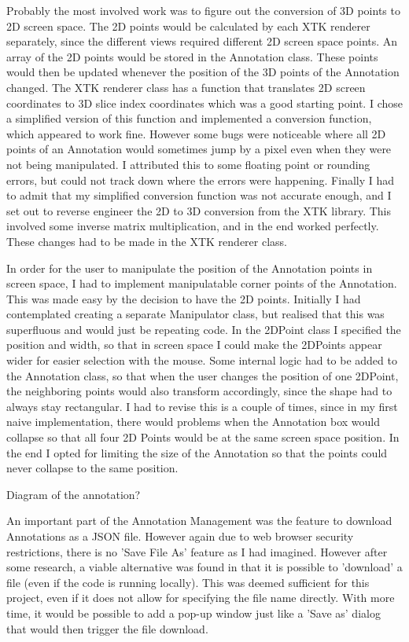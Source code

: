 \documentclass[a4paper,11pt,titlepage]{article}
\begin{document}
Probably the most involved work was to figure out the conversion of 3D points to 2D screen space. The 2D points would be calculated by each XTK renderer separately, since the different views required different 2D screen space points. An array of the 2D points would be stored in the Annotation class. These points would then be updated whenever the position of the 3D points of the Annotation changed. The XTK renderer class has a function that translates 2D screen coordinates to 3D slice index coordinates which was a good starting point. I chose a simplified version of this function and implemented a conversion function, which appeared to work fine. However some bugs were noticeable where all 2D points of an Annotation would sometimes jump by a pixel even when they were not being manipulated. I attributed this to some floating point or rounding errors, but could not track down where the errors were happening. Finally I had to admit that my simplified conversion function was not accurate enough, and I set out to reverse engineer the 2D to 3D conversion from the XTK library. This involved some inverse matrix multiplication, and in the end worked perfectly. These changes had to be made in the XTK renderer class.

In order for the user to manipulate the position of the Annotation points in screen space, I had to implement manipulatable corner points of the Annotation. This was made easy by the decision to have the 2D points. Initially I had contemplated creating a separate Manipulator class, but realised that this was superfluous and would just be repeating code. In the 2DPoint class I specified the position and width, so that in screen space I could make the 2DPoints appear wider for easier selection with the mouse. Some internal logic had to be added to the Annotation class, so that when the user changes the position of one 2DPoint, the neighboring points would also transform accordingly, since the shape had to always stay rectangular. I had to revise this is a couple of times, since in my first naive implementation, there would problems when the Annotation box would collapse so that all four 2D Points would be at the same screen space position. In the end I opted for limiting the size of the Annotation so that the points could never collapse to the same position.

Diagram of the annotation?


An important part of the Annotation Management was the feature to download Annotations as a JSON file. However again due to web browser security restrictions, there is no 'Save File As' feature as I had imagined. However after some research, a viable alternative was found in that it is possible to 'download' a file (even if the code is running locally). This was deemed sufficient for this project, even if it does not allow for specifying the file name directly. With more time, it would be possible to add a pop-up window just like a 'Save as' dialog that would then trigger the file download.
\end{document}
